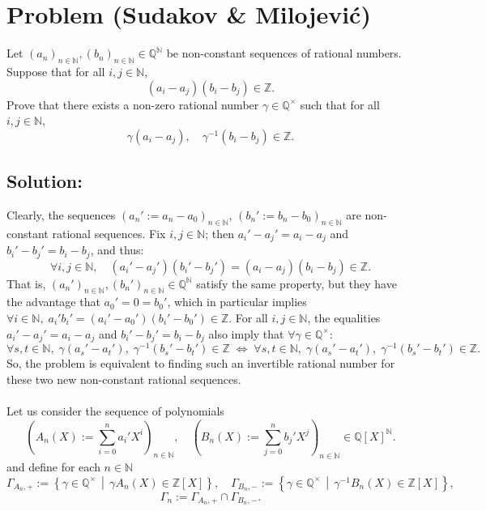 \documentclass[11pt, a4paper, oneside]{article}
\newcommand{\problem}[1][]{\section{#1} \hfill \par}
\newcommand{\solution}[1][]{\subsection*{#1}\hfill \par}
\theoremstyle{remark}
\theoremstyle{lemma}
\begin{document}
\newpage
\problem[Problem (Sudakov \& Milojević)]
Let \(\left( a_n \right)_{n \in \mathbb{N}}, \left( b_n \right)_{n \in \mathbb{N}} \in \mathbb{Q}^{\mathbb{N}}\) be non-constant sequences of rational numbers. Suppose that for all \( i, j \in \mathbb{N} \),
\[
\left( a_i - a_j \right)\left( b_i - b_j \right) \in \mathbb{Z}.
\]
Prove that there exists a non-zero rational number \( \gamma \in \mathbb{Q}^{\times} \) such that for all \( i, j \in \mathbb{N} \),
\[
\gamma\left( a_i - a_j \right), \quad \gamma^{-1}\left( b_i - b_j \right) \in \mathbb{Z}.
\]

\solution[Solution:]
Clearly, the sequences \( \left( a_n' := a_n - a_0 \right)_{n \in \mathbb{N}} \), \( \left( b_n' := b_n - b_0 \right)_{n \in \mathbb{N}} \) are non-constant rational sequences. Fix \( i, j \in \mathbb{N} \); then \( a_i' - a_j' = a_i - a_j \) and \( b_i' - b_j' = b_i - b_j \), and thus:
\[
\forall i,j \in \mathbb{N}, \quad \left( a_i' - a_j' \right)\left( b_i' - b_j' \right) = \left( a_i - a_j \right)\left( b_i - b_j \right) \in \mathbb{Z}.
\]
That is, \( \left( a_n' \right)_{n \in \mathbb{N}}, \left( b_n' \right)_{n \in \mathbb{N}} \in \mathbb{Q}^{\mathbb{N}} \) satisfy the same property, but they have the advantage that \( a_0' = 0 = b_0' \), which in particular implies \( \forall i \in \mathbb{N},\; a_i'b_i' = \left( a_i' - a_0' \right)\left( b_i' - b_0' \right) \in \mathbb{Z} \). For all \( i,j \in \mathbb{N} \), the equalities \( a_i' - a_j' = a_i - a_j \) and \( b_i' - b_j' = b_i - b_j \) also imply that \( \forall \gamma \in \mathbb{Q}^{\times} \):
\[
\forall s,t \in \mathbb{N},\; \gamma\left( a_s' - a_t' \right),\; \gamma^{-1}\left( b_s' - b_t' \right) \in \mathbb{Z} \;\Leftrightarrow\; \forall s,t \in \mathbb{N},\; \gamma\left( a_s' - a_t' \right),\; \gamma^{-1}\left( b_s' - b_t' \right) \in \mathbb{Z}.
\]
So, the problem is equivalent to finding such an invertible rational number for these two new non-constant rational sequences.
\\\\
Let us consider the sequence of polynomials
\[
\left( A_n(X) := \sum_{i=0}^{n} a_i' X^{i} \right)_{n\in\mathbb{N}}, \quad \left( B_n(X) := \sum_{j=0}^{n} b_j' X^{j} \right)_{n\in\mathbb{N}} \in \mathbb{Q}[X]^{\mathbb{N}}.
\]
and define for each \( n\in\mathbb{N} \)
\[
\Gamma_{A_n,+} := \left\{ \gamma \in \mathbb{Q}^{\times} \,\middle|\, \gamma A_n(X) \in \mathbb{Z}[X] \right\}, \quad
\Gamma_{B_n,-} := \left\{ \gamma \in \mathbb{Q}^{\times} \,\middle|\, \gamma^{-1} B_n(X) \in \mathbb{Z}[X] \right\},
\]
\[
\Gamma_n := \Gamma_{A_n,+} \cap \Gamma_{B_n,-}.
\]
\end{document}

